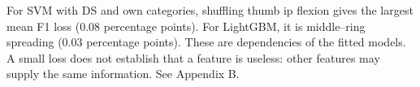 For SVM with DS and own categories, shuffling thumb ip flexion gives the largest mean F1 loss (0.08 percentage points). For LightGBM, it is middle–ring spreading (0.03 percentage points). These are dependencies of the fitted models. A small loss does not establish that a feature is useless: other features may supply the same information. See Appendix B.
